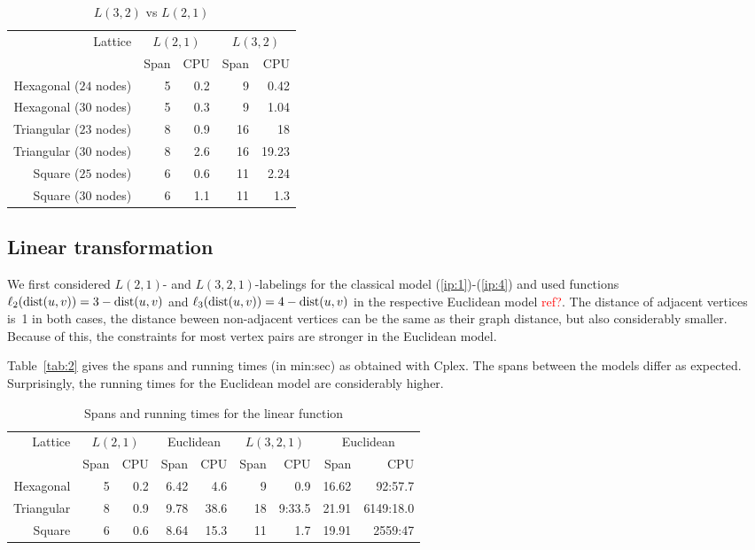 \documentclass[smallextended]{svjour3}
\def\dist{\mathop{\rm dist}}
\newcommand\ToDo[1]{\textcolor{red}{#1}}
\begin{document}
\begin{table}[h]
\centering
\begin{tabular}{|r||r|r|r|r|}
\hline 
Lattice  & \multicolumn{2}{c|}{$L(2,1)$} & \multicolumn{2}{c|}{$L(3,2)$}\\
         & Span & CPU & Span & CPU\\
\hline 
Hexagonal ($24$ nodes)  & 5 & 0.2 & 9 & 0.42 \\
\hline
Hexagonal ($30$ nodes)  & 5 & 0.3 & 9 & 1.04 \\
\hline
Triangular ($23$ nodes) & 8 & 0.9 & 16 & 18 \\
\hline
Triangular ($30$ nodes) & 8 & 2.6 & 16 & 19.23 \\
\hline 
Square ($25$ nodes)    & 6 & 0.6 & 11 & 2.24 \\
\hline
Square ($30$ nodes)  & 6 & 1.1 & 11 & 1.3 \\
\hline 
\end{tabular}
\caption{$L(3,2)$ vs $L(2,1)$} 
\label{tab:01}
\end{table}

\subsection{Linear transformation}

We first considered $L(2,1)$- and $L(3,2,1)$-labelings for the classical model (\ref{ip:1})-(\ref{ip:4}) and used functions $\ell_{2}(\dist(u,v))=3-\dist(u,v)$ and $\ell_{3}(\dist(u,v))=4-\dist(u,v)$
in the respective Euclidean model \ToDo{ref?}.
The distance of adjacent vertices is~1 in both cases,
the distance beween non-adjacent vertices can be the same as their graph distance,
but also considerably smaller. Because of this, the constraints for most vertex
pairs are stronger in the Euclidean model.

\noindent
Table~\ref{tab:2} gives the spans and running times (in min:sec) as obtained with Cplex.
The spans between the models differ as expected.
Surprisingly, the running times for the Euclidean model are considerably higher.

\begin{table}[h]
\begin{center}
\renewcommand{\arraystretch}{1.3}
\renewcommand{\tabcolsep}{8pt}
\begin{tabular}{|r||r|r|r|r||r|r|r|r|}
\hline 
Lattice  & \multicolumn{2}{c|}{$L(2,1)$} & \multicolumn{2}{c||}{Euclidean} & 
 \multicolumn{2}{c|}{$L(3,2,1)$} & \multicolumn{2}{c|}{Euclidean}\\
  & Span & CPU & Span & CPU & Span & CPU & Span & CPU\\
\hline 
Hexagonal   & 5 & 0.2 & 6.42 & 4.6 & 9 & 0.9& 16.62 & 92:57.7 \\
\hline 
Triangular  & 8 & 0.9 & 9.78 & 38.6 & 18 & 9:33.5& 21.91 & 6149:18.0 \\
\hline 
Square     & 6 & 0.6 & 8.64  & 15.3 & 11 & 1.7 & 19.91 & 2559:47  \\
\hline 
\end{tabular}
\end{center}
\caption{Spans and running times for the linear function}
\label{tab:1}
\end{table}
\end{document}
